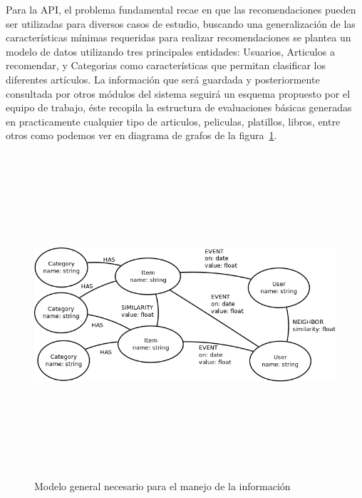 Para la API, el problema fundamental recae en que las recomendaciones pueden ser utilizadas para diversos casos de estudio, buscando una generalización de las características mínimas requeridas para realizar recomendaciones se plantea un modelo de datos utilizando tres principales entidades: Usuarios, Articulos a recomendar, y Categorias como características que permitan clasificar los diferentes artículos. La información que será guardada y posteriormente consultada por otros módulos del sistema seguirá un esquema propuesto por el equipo de trabajo, éste recopila la estructura de evaluaciones básicas generadas en practicamente cualquier tipo de articulos, peliculas, platillos, libros, entre otros como podemos ver en diagrama de grafos de la figura~\ref{fig:min model}.

\newpage
    \begin{landscape}
      \begin{figure}[h!]
      \centering
      \includegraphics[width=22.5cm,height=12cm]{./images/general_data_model.png}
      \caption{Modelo general necesario para el manejo de la información}
      \label{fig:min model}
    \end{figure}
    \end{landscape}
  \newpage
